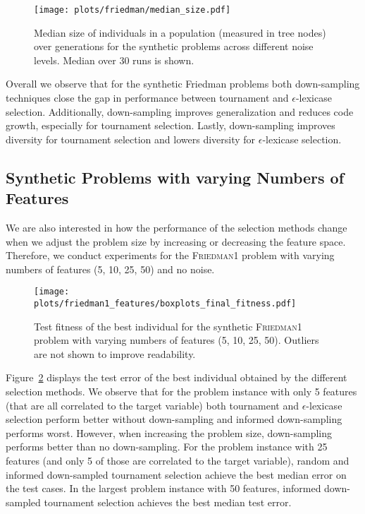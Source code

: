 \documentclass[runningheads]{llncs}
\begin{document}
\begin{figure}
    \centering
    \texttt{[image: plots/friedman/median\_size.pdf]}
    \caption{Median size of individuals in a population (measured in tree nodes) over generations for the synthetic problems across different noise levels. Median over 30 runs is shown.}
    \label{fig:friedman-size}
\end{figure}

Overall we observe that for the synthetic Friedman problems both down-sampling techniques close the gap in performance between tournament and $\epsilon$-lexicase selection. Additionally, down-sampling improves generalization and reduces code growth, especially for tournament selection. Lastly, down-sampling improves diversity for tournament selection and lowers diversity for $\epsilon$-lexicase selection.

\subsection{Synthetic Problems with varying Numbers of Features}
\label{subsec:results_synthetic_features}

We are also interested in how the performance of the selection methods change when we adjust the problem size by increasing or decreasing the feature space. Therefore, we conduct experiments for the \textsc{Friedman1} problem with varying numbers of features (5, 10, 25, 50) and no noise.

\begin{figure}
    \centering
    \texttt{[image: plots/friedman1\_features/boxplots\_final\_fitness.pdf]}
    \caption{Test fitness of the best individual for the synthetic \textsc{Friedman1} problem with varying numbers of features (5, 10, 25, 50).  Outliers are not shown to improve readability.}
    \label{fig:friedman_features-test_fitness_boxplots}
\end{figure}

Figure~\ref{fig:friedman_features-test_fitness_boxplots} displays the test error of the best individual obtained by the different selection methods. We observe that for the problem instance with only 5 features (that are all correlated to the target variable) both tournament and $\epsilon$-lexicase selection perform better without down-sampling and informed down-sampling performs worst. However, when increasing the problem size, down-sampling performs better than no down-sampling. For the problem instance with 25 features (and only 5 of those are correlated to the target variable), random and informed down-sampled tournament selection achieve the best median error on the test cases.
In the largest problem instance with 50 features, informed down-sampled tournament selection achieves the best median test error. 
\end{document}
